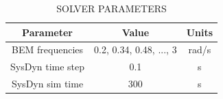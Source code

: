 \documentclass[twocolumn,10pt]{asme2e}
\begin{document}
\begin{table}[h]
    \centering
    \caption{SOLVER PARAMETERS}
    \begin{tabular}{ccc}
        \hline
        \textbf{Parameter} & \textbf{Value} & \textbf{Units} \\
        \hline
        BEM frequencies & 0.2, 0.34, 0.48, ..., 3& rad/s \\
        SysDyn time step & 0.1 & s \\
        SysDyn sim time & 300 & s \\
        \hline
    \end{tabular}
    \label{tab:paramssolve}
\end{table}
\end{document}
